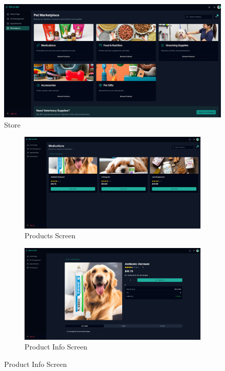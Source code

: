 \documentclass[12pt,a4paper,twoside]{book}
\begin{document}
\begin{figure}[H]
  \centering
  \includegraphics[width=\textwidth]{Resources/Final UI/store.png}
  \caption{Store}\label{fig:store-screen}
\end{figure}

\begin{figure}[H]
    \centering
    \begin{subfigure}[b]{0.48\textwidth}
        \centering
        \includegraphics[width=\textwidth]{Resources/Final UI/products.png}
        \caption{Products Screen}\label{fig:products-screen}
    \end{subfigure}
    \hfill
    \begin{subfigure}[b]{0.48\textwidth}
        \centering
        \includegraphics[width=\textwidth]{Resources/Final UI/product-info.png}
        \caption{Product Info Screen}\label{fig:product-info-screen}
    \end{subfigure}
\end{figure}
\end{document}
